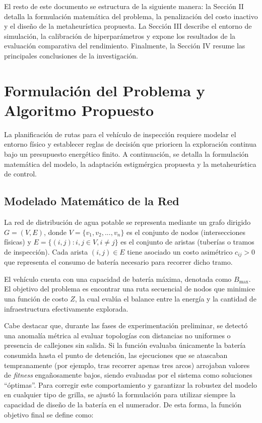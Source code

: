 \documentclass[conference]{IEEEtran}
\begin{document}
El resto de este documento se estructura de la siguiente manera: la Sección II detalla la formulación matemática del problema, la penalización del costo inactivo y el diseño de la metaheurística propuesta. La Sección III describe el entorno de simulación, la calibración de hiperparámetros y expone los resultados de la evaluación comparativa del rendimiento. Finalmente, la Sección IV resume las principales conclusiones de la investigación.

\section{Formulación del Problema y Algoritmo Propuesto}
La planificación de rutas para el vehículo de inspección requiere modelar el entorno físico y establecer reglas de decisión que prioricen la exploración continua bajo un presupuesto energético finito. A continuación, se detalla la formulación matemática del modelo, la adaptación estigmérgica propuesta y la metaheurística de control.

\subsection{Modelado Matemático de la Red}
La red de distribución de agua potable se representa mediante un grafo dirigido $G = (V,E)$, donde $V = \{v_1, v_2, ..., v_n\}$ es el conjunto de nodos (intersecciones físicas) y $E = \{(i,j) : i,j \in V, i \neq j\}$ es el conjunto de aristas (tuberías o tramos de inspección). Cada arista $(i,j) \in E$ tiene asociado un costo asimétrico $c_{ij} > 0$ que representa el consumo de batería necesario para recorrer dicho tramo.

El vehículo cuenta con una capacidad de batería máxima, denotada como $B_{\text{max}}$. El objetivo del problema es encontrar una ruta secuencial de nodos que minimice una función de costo $Z$, la cual evalúa el balance entre la energía y la cantidad de infraestructura efectivamente explorada.

Cabe destacar que, durante las fases de experimentación preliminar, se detectó una anomalía métrica al evaluar topologías con distancias no uniformes o presencia de callejones sin salida. Si la función evaluaba únicamente la batería consumida hasta el punto de detención, las ejecuciones que se atascaban tempranamente (por ejemplo, tras recorrer apenas tres arcos) arrojaban valores de \textit{fitness} engañosamente bajos, siendo evaluadas por el sistema como soluciones ``óptimas''. Para corregir este comportamiento y garantizar la robustez del modelo en cualquier tipo de grilla, se ajustó la formulación para utilizar siempre la capacidad de diseño de la batería en el numerador. De esta forma, la función objetivo final se define como:
\end{document}
